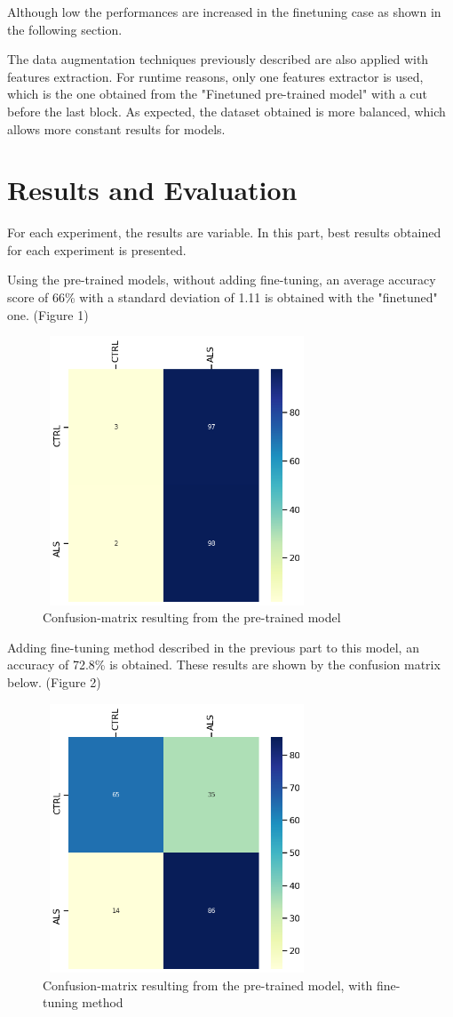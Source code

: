 Although low the performances are increased  in the finetuning case as shown in the following section.

The data augmentation techniques previously described are also applied with features extraction. For runtime reasons, only one features extractor is used, which is the one obtained from the "Finetuned pre-trained model" with a cut before the last block.
As expected, the dataset obtained is more balanced, which allows more constant results for models.

\section{Results and Evaluation}
For each experiment, the results are variable. In this part, best results obtained for each experiment is presented.

Using the pre-trained models, without adding fine-tuning, an average accuracy score of 66\% with a standard deviation of 1.11 is obtained with the "finetuned" one. (Figure 1)
\begin{figure}[H]
\centering
\caption{Confusion-matrix resulting from the pre-trained model}
\includegraphics[width=8cm, height=8cm]{raw_model_results}
\end{figure}

Adding fine-tuning method described in the previous part to this model, an accuracy of 72.8\% is obtained. These results are shown by the confusion matrix below. (Figure 2)
\begin{figure}[H]
\centering
\caption{Confusion-matrix resulting from the pre-trained model, with fine-tuning method}
\includegraphics[width=8cm, height=8cm]{finetuning_model_results}
\end{figure}


